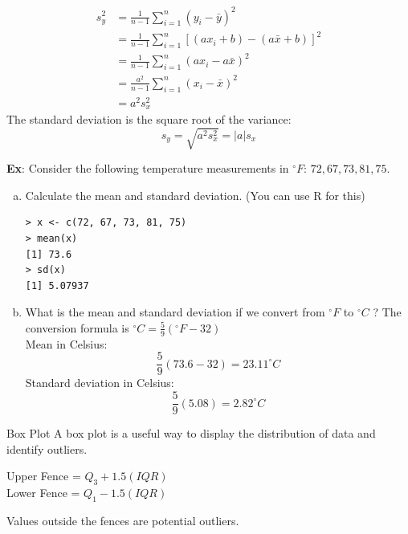 \documentclass{beamer}
\begin{document}
\begin{frame}
\normalsize
{\color{blue}
\begin{align*}
s_y^2 &= \frac{1}{n-1} \sum_{i=1}^n (y_i - \bar{y})^2\\
&= \frac{1}{n-1} \sum_{i=1}^n [(ax_i + b) - (a\bar{x} + b)]^2\\
&= \frac{1}{n-1} \sum_{i=1}^n (a x_i - a \bar{x})^2\\
&= \frac{a^2}{n-1} \sum_{i=1}^n (x_i - \bar{x})^2\\
&= a^2 s_x^2
\end{align*}
The standard deviation is the square root of the variance:
$$s_y = \sqrt{a^2 s_x^2} = |a|s_x$$
}

\end{frame}

\begin{frame}[fragile]
\small
\textbf{Ex}: Consider the following temperature measurements in $^{\circ}F$: $72, 67, 73, 81, 75$.  
\begin{enumerate}[(a)]
\item Calculate the mean and standard deviation. (You can use R for this)\\
\vspace{-5pt}
{\color{blue}
\begin{verbatim}
> x <- c(72, 67, 73, 81, 75)
> mean(x)
[1] 73.6
> sd(x)
[1] 5.07937
\end{verbatim}
}
\item What is the mean and standard deviation if we convert from $^{\circ}F$ to $^{\circ}C$ ?  The conversion formula is $^{\circ}C = \frac{5}{9} (^{\circ}F - 32)$\\
\medskip
{\color{blue}
Mean in Celsius:\\
$$\frac{5}{9}(73.6 - 32) = 23.11^{\circ}C$$
Standard deviation in Celsius:\\
$$\frac{5}{9} (5.08) = 2.82^{\circ}C$$
}
\end{enumerate}
\end{frame}




\begin{frame}{Box Plot}
A box plot is a useful way to display the distribution of data and identify outliers.\\
\vspace{10pt}

Upper Fence = $Q_3 + 1.5(IQR)$\\
Lower Fence = $Q_1 - 1.5(IQR)$\\
\vspace{10pt}

Values outside the fences are potential outliers.
\end{frame}
\end{document}
